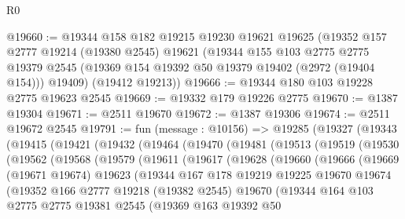 \begin{lexlean}{R0}
\begin{coremodule}
@19660 := @19344
    @158
    @182
    @19215
    @19230
    @19621
    @19625
    (@19352
      @157
      @2777
      @19214
      (@19380 @2545)
      @19621
      (@19344
        @155
        @103
        @2775
        @2775
        @19379
        @2545
        (@19369 @154 @19392 @50 @19379 @19402 (@2972 (@19404 @154)))
        @19409)
      (@19412 @19213))
@19666 := @19344 @180 @103 @19228 @2775 @19623 @2545
@19669 := @19332 @179 @19226 @2775
@19670 := @1387 @19304
@19671 := @2511 @19670
@19672 := @1387 @19306
@19674 := @2511 @19672 @2545
@19791 := fun (message : @10156) =>
  @19285
    (@19327
      (@19343
        (@19415
          (@19421
            (@19432
              (@19464
                (@19470
                  (@19481
                    (@19513
                      (@19519
                        (@19530
                          (@19562
                            (@19568
                              (@19579
                                (@19611
                                  (@19617
                                    (@19628
                                      (@19660
                                        (@19666
                                          (@19669
                                            (@19671 @19674)
                                            @19623
                                            (@19344
                                              @167
                                              @178
                                              @19219
                                              @19225
                                              @19670
                                              @19674
                                              (@19352
                                                @166
                                                @2777
                                                @19218
                                                (@19382 @2545)
                                                @19670
                                                (@19344
                                                  @164
                                                  @103
                                                  @2775
                                                  @2775
                                                  @19381
                                                  @2545
                                                  (@19369
                                                    @163
                                                    @19392
                                                    @50

\end{coremodule}
\end{lexlean}
